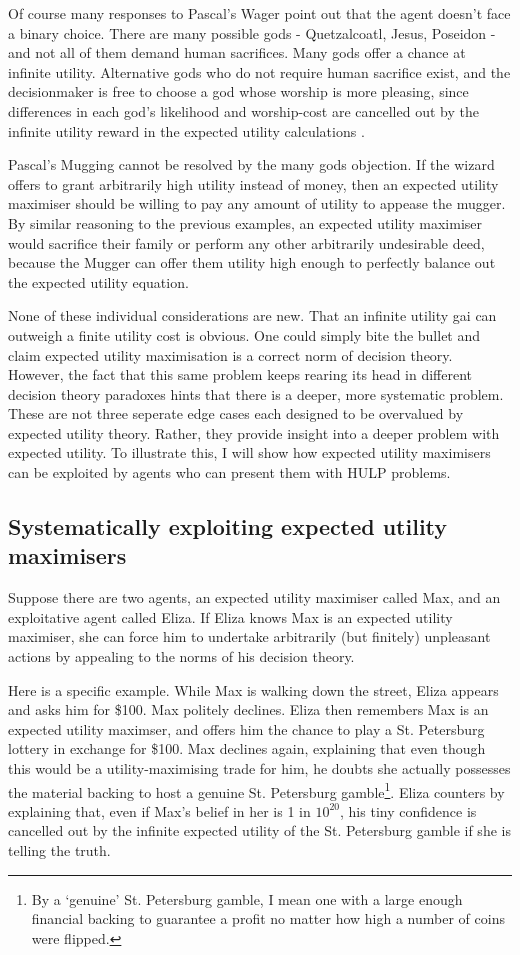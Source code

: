 \documentclass{article}
\begin{document}
Of course many responses to Pascal's Wager point out that the agent doesn't face a binary choice. There are many possible gods - Quetzalcoatl, Jesus, Poseidon - and not all of them demand human sacrifices. Many gods offer a chance at infinite utility. Alternative gods who do not require human sacrifice exist, and the decisionmaker is free to choose a god whose worship is more pleasing, since differences in each god's likelihood and worship-cost are cancelled out by the infinite utility reward in the expected utility calculations \citep{diderot1746pensees}.

Pascal's Mugging cannot be resolved by the many gods objection. If the wizard offers to grant arbitrarily high utility instead of money, then an expected utility maximiser should be willing to pay any amount of utility to appease the mugger. By similar reasoning to the previous examples, an expected utility maximiser would sacrifice their family or perform any other arbitrarily undesirable deed, because the Mugger can offer them utility high enough to perfectly balance out the expected utility equation.

None of these individual considerations are new. That an infinite utility gai can outweigh a finite utility cost is obvious. One could simply bite the bullet and claim expected utility maximisation is a correct norm of decision theory. However, the fact that this same problem keeps rearing its head in different decision theory paradoxes hints that there is a deeper, more systematic problem. These are not three seperate edge cases each designed to be overvalued by expected utility theory. Rather, they provide insight into a deeper problem with expected utility. To illustrate this, I will show how expected utility maximisers can be exploited by agents who can present them with HULP problems.

\subsection{Systematically exploiting expected utility maximisers}

Suppose there are two agents, an expected utility maximiser called Max, and an exploitative agent called Eliza. If Eliza knows Max is an expected utility maximiser, she can force him to undertake arbitrarily (but finitely) unpleasant actions by appealing to the norms of his decision theory. 

Here is a specific example. While Max is walking down the street, Eliza appears and asks him for \$100. Max politely declines. Eliza then remembers Max is an expected utility maximser, and offers him the chance to play a St. Petersburg lottery in exchange for \$100. Max declines again, explaining that even though this would be a utility-maximising trade for him, he doubts she actually possesses the material backing to host a genuine St. Petersburg gamble\footnote{By a `genuine' St. Petersburg gamble, I mean one with a large enough financial backing to guarantee a profit no matter how high a number of coins were flipped.}. Eliza counters by explaining that, even if Max's belief in her is 1 in \(10^{20}\), his tiny confidence is cancelled out by the infinite expected utility of the St. Petersburg gamble if she is telling the truth.
\end{document}
